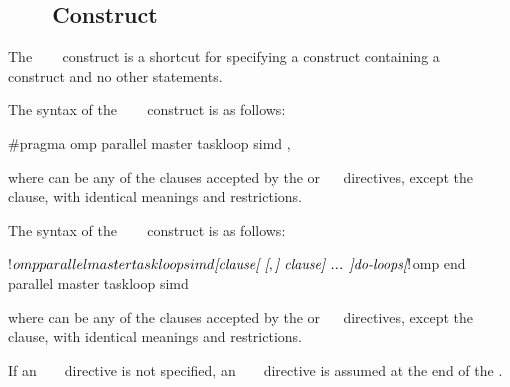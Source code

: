 \subsection{~~~ Construct}
\label{subsec:parallel master taskloop simd Construct}

\summary
The ~~~ construct is a 
shortcut for specifying a  construct containing a
~~ construct and no other statements.

\syntax
\begin{ccppspecific}
The syntax of the ~~~ 
construct is as follows:

\begin{ompcPragma}
#pragma omp parallel master taskloop simd \plc{[clause[ [},\plc{] clause] ... ] new-line}
\end{ompcPragma}

where  can be any of the clauses accepted by the  
or ~~ directives, except the 
 clause, with identical meanings and restrictions.
\end{ccppspecific}

\begin{fortranspecific}
The syntax of the ~~~ 
construct is as follows:

\begin{ompfPragma}
!$omp parallel master taskloop simd \plc{[clause[ [},\plc{] clause] ... ]}
    \plc{do-loops}
\plc{[}!$omp end parallel master taskloop simd\plc{]}
\end{ompfPragma}

where  can be any of the clauses accepted by the  or
~~ directives, except the 
 clause, with identical meanings and restrictions.

If an ~  ~ 
directive is not specified, an ~ 
~ directive is assumed at the end of the .
\end{fortranspecific}

